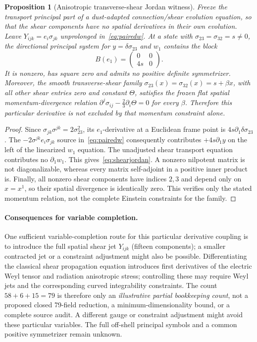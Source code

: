 \documentclass[11pt,a4paper]{article}
\newtheorem{proposition}[theorem]{Proposition}
\begin{document}
\begin{proposition}[Anisotropic transverse-shear Jordan witness]\label{prop:shearjordan}
Freeze the transport principal part of a dust-adapted connection/shear evolution equation, so that the shear components have no spatial derivatives in their own evolution. Leave $Y_{ijk}=e_i\sigma_{jk}$ unprolonged in~\eqref{eq:pairedw}. At a state with $\sigma_{23}=\sigma_{32}=s\ne0$, the directional principal system for $y=\delta\sigma_{23}$ and $w_1$ contains the block
\begin{equation}\label{eq:shearjordan}
B(e_1)=\begin{pmatrix}0&0\\4s&0\end{pmatrix}.
\end{equation}
It is nonzero, has square zero and admits no positive definite symmetrizer. Moreover, the smooth transverse-shear family
$\sigma_{23}(x)=\sigma_{32}(x)=s+\beta x$, with all other shear entries zero and constant $\Theta$, satisfies the frozen flat spatial momentum-divergence relation $\partial^j\sigma_{ij}-\tfrac23\partial_i\Theta=0$ for every $\beta$. Therefore this particular derivative is not excluded by that momentum constraint alone.
\end{proposition}
\begin{proof}
Since $\sigma_{jk}\sigma^{jk}=2\sigma_{23}^2$, its $e_1$-derivative at a Euclidean frame point is $4s\partial_1\delta\sigma_{23}$. The $-2\sigma^{jk}e_i\sigma_{jk}$ source in~\eqref{eq:pairedw} consequently contributes $+4s\partial_1y$ on the left of the linearized $w_1$ equation. The unadjusted shear transport equation contributes no $\partial_1w_1$. This gives~\eqref{eq:shearjordan}. A nonzero nilpotent matrix is not diagonalizable, whereas every matrix self-adjoint in a positive inner product is. Finally, all nonzero shear components have indices $2,3$ and depend only on $x=x^1$, so their spatial divergence is identically zero. This verifies only the stated momentum relation, not the complete Einstein constraints for the family.
\end{proof}

\paragraph{Consequences for variable completion.}
One sufficient variable-completion route for this particular derivative coupling is to introduce the full spatial shear jet $Y_{ijk}$ (fifteen components); a smaller contracted jet or a constraint adjustment might also be possible. Differentiating the classical shear propagation equation introduces first derivatives of the electric Weyl tensor and radiation anisotropic stress; controlling these may require Weyl jets and the corresponding curved integrability constraints. The count $58+6+15=79$ is therefore only an \emph{illustrative partial bookkeeping count}, not a proposed closed 79-field reduction, a minimum-dimensionality bound, or a complete source audit. A different gauge or constraint adjustment might avoid these particular variables. The full off-shell principal symbols and a common positive symmetrizer remain unknown.
\end{document}
